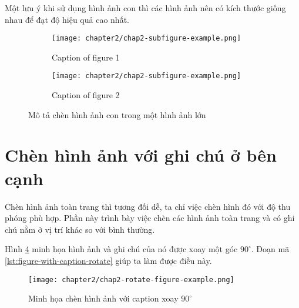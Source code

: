 Một lưu ý khi sử dụng hình ảnh con thì các hình ảnh nên có kích thước giống nhau để đạt độ hiệu quả cao nhất.

\begin{figure}
    \begin{subfigure}{0.5\textwidth}
        \centering
        \texttt{[image: chapter2/chap2-subfigure-example.png]}
        \caption{Caption of figure 1}
        \label{fig:chap2-subfigure-example-1}
    \end{subfigure}%
    \begin{subfigure}{0.5\textwidth}
        \centering
        \texttt{[image: chapter2/chap2-subfigure-example.png]}
        \caption{Caption of figure 2}
        \label{fig:chap2-subfigure-example-2}
    \end{subfigure}
    \caption{Mô tả chèn hình ảnh con trong một hình ảnh lớn}
    \label{fig:chap2-subfigure-example}
\end{figure}

\section{Chèn hình ảnh với ghi chú ở bên cạnh}

Chèn hình ảnh toàn trang thì tương đối dễ, ta chỉ việc chèn hình đó với độ thu phóng phù hợp. Phần này trình bày việc chèn các hình ảnh toàn trang và có ghi chú nằm ở vị trí khác so với bình thường.

Hình \ref{fig:img-caption-rotate} minh họa hình ảnh và ghi chú của nó được xoay một góc $90^{\circ}$. Đoạn mã \ref{lst:figure-with-caption-rotate} giúp ta làm được điều này.

\begin{figure}
    \begin{minipage}[c]{0.8\textwidth}
      \centering
      \texttt{[image: chapter2/chap2-rotate-figure-example.png]} 
    \end{minipage}
    \begin{minipage}[c]{0.1\textwidth}
      \begin{adjustbox}{angle=90,center}
        \begin{minipage}[c]{\textheight}
          \caption{Minh họa chèn hình ảnh với caption xoay $90^{\circ}$}
          \label{fig:img-caption-rotate}
        \end{minipage}
      \end{adjustbox}
    \end{minipage}
\end{figure}

